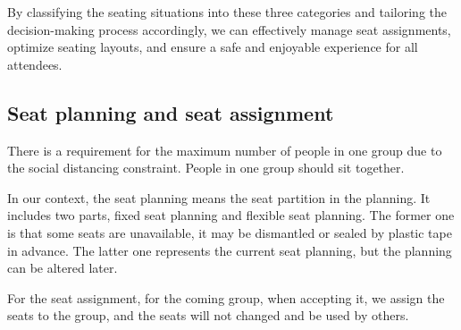 By classifying the seating situations into these three categories and tailoring the decision-making process accordingly, we can effectively manage seat assignments, optimize seating layouts, and ensure a safe and enjoyable experience for all attendees.

\subsection{Seat planning and seat assignment}
There is a requirement for the maximum number of people in one group due to the social distancing constraint. People in one group should sit together.

In our context, the seat planning means the seat partition in the planning. It includes two parts, fixed seat planning and flexible seat planning. The former one is that some seats are unavailable, it may be dismantled or sealed by plastic tape in advance. The latter one represents the current seat planning, but the planning can be altered later.

For the seat assignment, for the coming group, when accepting it, we assign the seats to the group, and the seats will not changed and be used by others.

\newpage
